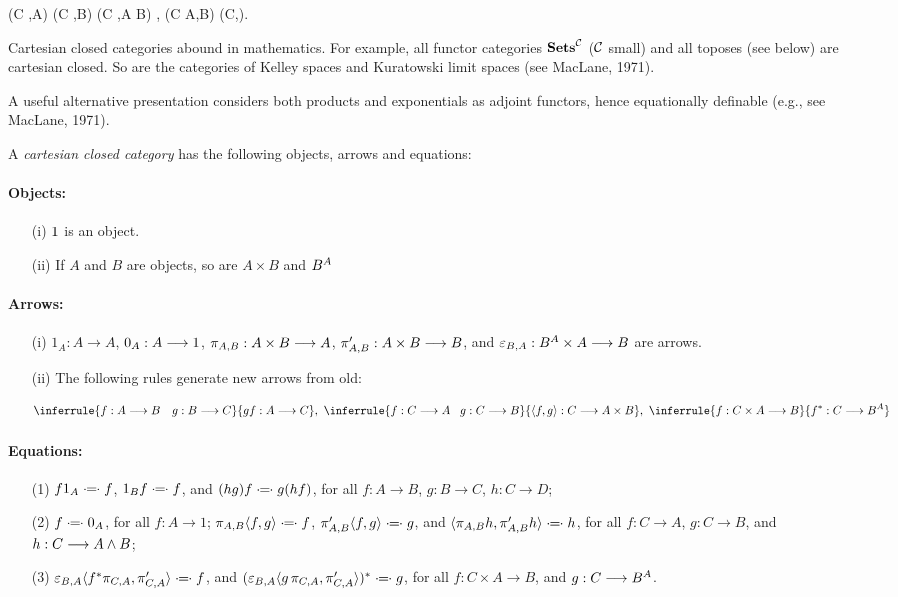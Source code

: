 \bes
\Hom(C ,A) \times \Hom(C ,B)  \iso \Hom(C ,A \times B) ,
\ees
\bes
\Hom(C \times A,B) \iso \Hom(C,).
\ees

Cartesian closed categories abound in mathematics. For example, all
functor categories ${\mathbf {Sets}}^{\mathcal C}$ ($\mathcal C$ small) and all toposes (see below) are cartesian
closed. So are the categories of Kelley spaces and Kuratowski limit spaces
(see MacLane, 1971).

A useful alternative presentation considers both products and exponentials
as adjoint functors, hence equationally definable (e.g., see MacLane, 1971).

\def\deq{\mathop{\cdot\mkern-5mu=\mkern-5mu\cdot}}

\begin{defn}
A {\em cartesian closed category} has the following objects,
arrows and equations:

\paragraph{Objects:}
\begin{enumerate}
\item[(i)] $1$ is an object.
\item[(ii)] If $A$ and $B$ are objects, so are $A \times B$ and $B^{A}$
\end{enumerate}

\paragraph{Arrows:}
\begin{enumerate}
\item[(i)] $1_A: A \to A$, $0_A: A \longrightarrow 1$, $\pi_{A,B}: A \times B \longrightarrow A$, 
$\pi'_{A,B}: A \times B \longrightarrow B$,
and $\varepsilon_{B,A}: B^{A} \times A \longrightarrow B$ are arrows.

\item[(ii)] The following rules generate new arrows from old:

\[
\inferrule {f: A \to B \quad g: B \to C}{gf: A \to C},\,\,
\inferrule {f: C \to A \quad\! g: C \to B}{\la f, g \ra: C \to A \times B}, \,\,
\inferrule {f: C \times A \to B}{f^*: C \to \fexpBA}
\]

\end{enumerate}

\paragraph{Equations:}
\begin{enumerate}
\item[(1)] $f1_A \mathrel{\cdot\!\!=\!\!\cdot} f$, $1_Bf \mathrel{\cdot\!\!=\!\!\cdot} f$, and $(hg)f \mathrel{\cdot\!\!=\!\!\cdot} g(hf)$,
for all $f:A \to B$, $g:B \to C$, $h: C\to D$;
\item[(2)] $f \mathrel{\cdot\!\!=\!\!\cdot} 0_A$, for all $f: A \to 1$;
$\pi_{A,B}\langle f,g \rangle \mathrel{\cdot\!\!=\!\!\cdot} f$, $\pi'_{A,B}\langle f,g \rangle \mathrel{\cdot\!\!=\!\!\cdot} g$, and
$\langle\pi_{A,B} h, \pi'_{A,B} h\rangle \mathrel{\cdot\!\!=\!\!\cdot} h$,
for all $f:C \to A$, $g:C \to B$, and $h: C\longrightarrow A\wedge B$;
\item[(3)] $\varepsilon_{B,A}\langle f^*\pi_{C,A}, \pi'_{C,A} \rangle \mathrel{\cdot\!\!=\!\!\cdot} f$, and
$(\varepsilon_{B,A}\langle g\,\pi_{C,A}, \pi'_{C,A} \rangle)^* \mathrel{\cdot\!\!=\!\!\cdot} g$,
for all $f: C\times A \to B$, and $g: C \longrightarrow B^{A}$.
\end{enumerate}


\end{defn}
